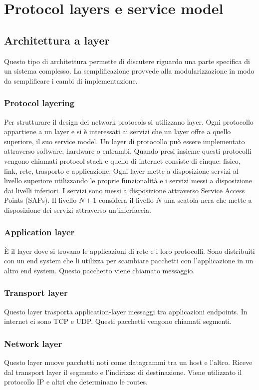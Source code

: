 \section{Protocol layers e service model}
\subsection{Architettura a layer}
Questo tipo di architettura permette di discutere riguardo una parte specifica di un sistema complesso. La semplificazione provvede alla modularizzazione in modo da semplificare i cambi di implementazione.
\subsubsection{Protocol layering}
Per strutturare il design dei network protocols si utilizzano layer. Ogni protocollo appartiene a un layer e si \`e interessati ai servizi che un layer offre a quello superiore, il suo service 
model. Un layer di protocollo pu\`o essere implementato attraverso software, hardware o entrambi. Quando presi insieme questi protocolli vengono chiamati protocol stack e quello di internet consiste di 
cinque: fisico, link, rete, trasporto e applicazione. Ogni layer mette a disposizione servizi al livello superiore utilizzando le proprie
funzionalit\`a e i servizi messi a disposizione dai livelli inferiori. I servizi sono messi a disposizione attraverso Service Access Points
(SAPs). Il livello $N+1$ considera il livello $N$ una scatola nera che mette a disposizione dei servizi attraverso un'inferfaccia.
\subsubsection{Application layer}
\`E il layer dove si trovano le applicazioni di rete e i loro protocolli. Sono distribuiti con un end system che li utilizza per scambiare pacchetti con l'applicazione in un altro end system. Questo pacchetto viene
chiamato messaggio.
\subsubsection{Transport layer}
Questo layer trasporta application-layer messaggi tra applicazioni endpoints. In internet ci sono TCP e UDP. Questi pacchetti vengono chiamati segmenti.
\subsubsection{Network layer}
Questo layer muove pacchetti noti come datagrammi tra un host e l'altro. Riceve dal transport layer il segmento e l'indirizzo di destinazione. Viene utilizzato il protocollo IP e altri che determinano le routes.
